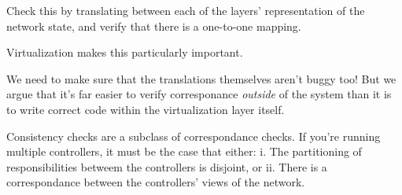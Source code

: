 Check this by translating between each of the layers' representation of the
network state, and verify that there is a one-to-one mapping. 

Virtualization makes this particularly important.

We need to make sure that the translations themselves aren't buggy too! But we
argue that it's far easier to verify corresponance {\it outside} of the system
than it is to write correct code within the virtualization layer itself.

Consistency checks are a subclass of correspondance checks. If you're running
multiple controllers, it must be the case that either: i. The partitioning of
responsibilities betweem the controllers is disjoint, or ii. There is a
correspondance between the controllers' views of the network.

